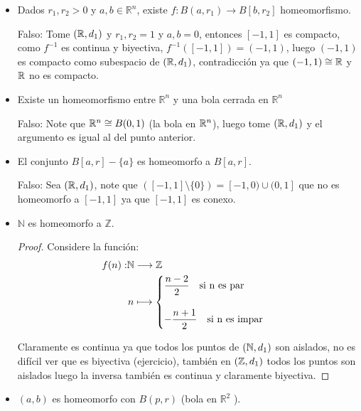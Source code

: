 \begin{itemize}[leftmargin=*]
    \item Dados $r_1, r_2>0$ y $a, b \in \mathbb{R}^n$, existe $f: B\left(a, r_1\right) \rightarrow B\left[b, r_2\right]$ homeomorfismo.

Falso: Tome $(\mathbb{R},d_1)$ y $r_1,r_2=1$ y $a,b=0$, entonces $[-1,1]$ es compacto, como $f^{-1}$ es continua y biyectiva, $f^{-1}([-1,1])=(-1,1)$, luego $(-1,1)$ es compacto como subespacio de $(\mathbb{R},d_1)$, contradicción ya que $(-1,1)\cong \mathbb{R}$ y $\mathbb{R}$ no es compacto. 

\item Existe un homeomorfismo entre $\mathbb{R}^n$ y una bola cerrada en $\mathbb{R}^n$

Falso: Note que $\mathbb{R}^n\cong B(0,1)$ (la bola en $\mathbb{R}^n$), luego tome $(\mathbb{R},d_1)$ y el argumento es igual al del punto anterior. 

\item El conjunto $B[a, r]-\{a\}$ es homeomorfo a $B[a, r]$.

Falso: Sea $(\mathbb{R},d_1)$, note que $([-1,1]\setminus \{0\})=[-1,0)\cup(0,1]$ que no es homeomorfo a $[-1,1]$ ya que $[-1,1]$ es conexo.

\item $\mathbb{N}$ es homeomorfo a $\mathbb{Z}$.\\

\begin{proof}
Considere la función:
\begin{align*}
    f(n): &\N \longrightarrow \Z\\
    &\hspace{0.03cm}n \longmapsto \begin{cases}
\dfrac{n-2}{2} \quad \text{si } $n$ \text{ es par}\\\\
-\dfrac{n+1}{2} \quad \text{si } $n$ \text{ es impar}
\end{cases}
\end{align*}

Claramente es continua ya que todos los puntos de $(\mathbb{N},d_1)$ son aislados, no es difícil ver que es biyectiva (ejercicio), también en $(\mathbb{Z},d_1)$ todos los puntos son aislados luego la inversa también es continua y claramente biyectiva.

\end{proof}

\item  $(a, b)$ es homeomorfo con $B(p, r)$ (bola en $\mathbb{R}^2$ ).


\end{itemize}
